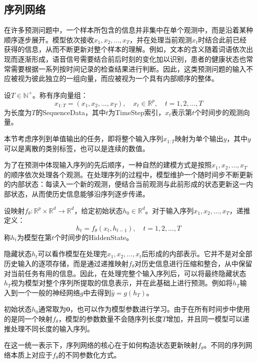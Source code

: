 \subsection{序列网络}
在许多预测问题中，一个样本所包含的信息并非集中在单个观测中，而是沿着某种顺序逐步展开。模型依次接收$x_1,x_2,\dots,x_T$，并在处理当前观测$x_t$时结合此前已经获得的信息，从而不断更新对整个样本的理解。例如，文本的含义随着词语依次出现而逐渐形成，语音信号需要结合前后时刻的变化加以识别，患者的健康状态也常常需要根据一系列按时间记录的检查结果进行判断。因此，这类预测问题的输入不应被视为彼此独立的一组向量，而应被视为一个具有内部顺序的整体。
\begin{definition}
	设$T\in\mathbb{N}^+$。称有序向量组：
	\begin{equation*}
		x_{1:T}=(x_1,x_2,\dots,x_T),\quad x_t\in\mathbb{R}^p,\quad t=1,2,\dots,T
	\end{equation*}
	为长度为$T$的\gls{SequenceData}，其中$t$为\gls{TimeStep}索引，$x_t$表示第$t$个时间步的观测向量。
\end{definition}
本节考虑序列到单值输出的任务，即将整个输入序列$x_{1:T}$映射为单个输出$y$，其中$y$可以是离散的类别标签，也可以是连续的数值。\par
为了在预测中体现输入序列的先后顺序，一种自然的建模方式是按照$x_1,x_2,\dots,x_T$的顺序依次处理各个观测。在处理序列的过程中，模型维护一个随时间步不断更新的内部状态：每读入一个新的观测，便结合当前观测与此前形成的状态更新这一内部状态，从而使历史信息能够沿序列逐步传递。
\begin{definition}
	设映射$f_\theta:\mathbb{R}^p\times\mathbb{R}^d\to\mathbb{R}^d$，给定初始状态$h_0\in\mathbb{R}^d$。对于输入序列$x_1,x_2,\dots,x_T$，递推定义：
	\begin{equation*}
		h_t=f_\theta(x_t,h_{t-1}),\quad t=1,2,\dots,T
	\end{equation*}
	称$h_t$为模型在第$t$个时间步的\gls{HiddenState}。
\end{definition}
隐藏状态$h_t$可以看作模型在处理完$x_1,x_2,\dots,x_t$后形成的内部表示。它并不是对全部历史输入的逐项存储，而是通过递推映射$f_\theta$对历史信息进行压缩和整合，从中保留对当前任务有用的信息。因此，在处理完整个输入序列后，可以将最终隐藏状态$h_T$视为模型对整个序列所提取的信息表示，并在此基础上进行预测。例如将$h_T$输入到一个一般的神经网络$g$中去得到$\hat{y}=g(h_T)$。\par
初始状态$h_0$通常取为$\mathbf{0}$，也可以作为模型参数进行学习。由于在所有时间步中使用的是同一个映射$f_\theta$，模型的参数数量不会随序列长度$T$增加，并且同一模型可以递推处理不同长度的输入序列。
\begin{note}
	在这一统一表示下，序列网络的核心在于如何构造状态更新映射$f_\theta$。不同的序列网络本质上对应于$f_\theta$的不同参数化方式。
\end{note}
